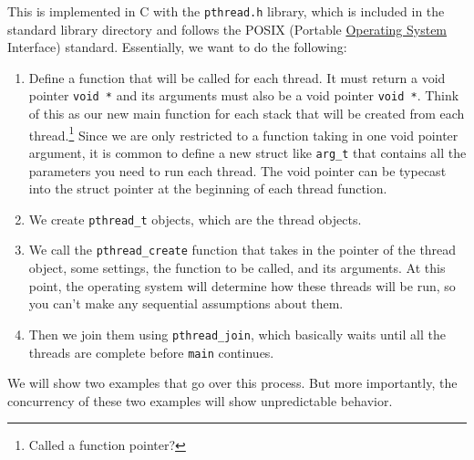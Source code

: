 \documentclass{article}
\newcounter{example}[section]
\begin{document}
    This is implemented in C with the \texttt{pthread.h} library, which is included in the standard library directory and follows the POSIX (Portable \hyperref[def:operating-system]{Operating System} Interface) standard. Essentially, we want to do the following: 
    \begin{enumerate}
      \item Define a function that will be called for each thread. It must return a void pointer \texttt{void *} and its arguments must also be a void pointer \texttt{void *}. Think of this as our new main function for each stack that will be created from each thread.\footnote{Called a function pointer?} Since we are only restricted to a function taking in one void pointer argument, it is common to define a new struct like \texttt{arg\_t} that contains all the parameters you need to run each thread. The void pointer can be typecast into the struct pointer at the beginning of each thread function. 

      \item We create \texttt{pthread\_t} objects, which are the thread objects. 
      \item We call the \texttt{pthread\_create} function that takes in the pointer of the thread object, some settings, the function to be called, and its arguments. At this point, the operating system will determine how these threads will be run, so you can't make any sequential assumptions about them. 
      \item Then we join them using \texttt{pthread\_join}, which basically waits until all the threads are complete before \texttt{main} continues. 
    \end{enumerate}

    We will show two examples that go over this process. But more importantly, the concurrency of these two examples will show unpredictable behavior. 
\end{document}
